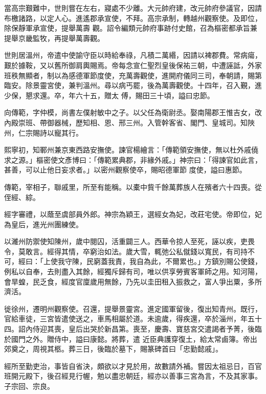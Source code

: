 \begin{pinyinscope}
 當高宗艱難中，世則嘗在左右，寢處不少離。大元帥府建，改元帥府參議官，因請布檄諸路，以定人心。進遙郡承宣使，不拜。高宗承制，轉越州觀察使。及即位，除保靜軍承宣使，提舉萬壽
 觀。詔令編類元帥府事跡付史館，召為樞密都承旨兼提舉京畿監牧，再提舉萬壽觀。



 世則居溫州，帝遣中使諭守臣以時給奉祿，凡積二萬緡，因請以裨郡費。常病瘍，艱於據鞍，又以舊所御肩輿賜焉。帝每念宣仁聖烈皇後保祐三朝，中遭誣詆，外家班秩無顯者，制以為感德軍節度使，充萬壽觀使，進開府儀同三司，奉朝請，賜第臨安。除景靈宮使，兼判溫州。尋以病丐罷，後為萬壽觀使。十四年，召入覲，進少保，懇求還。卒，年六十五，贈太
 傅，賜田三十頃，謚曰忠節。



 向傳範，字仲模，尚書左僕射敏中之子。以父任為衛尉丞。娶南陽郡王惟吉女，改內殿崇班、帶御器械，歷知相、恩、邢三州。入管幹客省、閣門、皇城司。知陜州，仁宗賜詩以寵其行。



 熙寧初，知鄆州兼京東西路安撫使。諫官楊繪言：「傳範領安撫使，無以杜外戚僥求之源。」樞密使文彥博曰：「傳範累典郡，非緣外戚。」神宗曰：「得諫官如此言，甚善，可以止他日妄求者。」以密州觀察使卒，賜昭德軍節
 度使，謚曰惠節。



 傳範，宰相子，聯戚里，所至有能稱。以橐中貲千餘萬葬族人在殯者六十四喪。從侄經、綜。



 經字審禮，以蔭至虞部員外郎。神宗為穎王，選經女為妃，改莊宅使。帝即位，妃為皇后，進光州團練使。



 以濰州防禦使知陳州，歲中閱囚，活重闢三人。西華令掠人至死，誣以疾，吏畏令，莫敢言。經得其情，卒窮治如法。歲大雪，輒弛公私僦錢以寬民，有司持不可，經曰：「上使我守陳，民窮蓋我責，我自為此，不爾累也。」方鎮別賜公使錢，
 例私以自奉，去則盡入其餘，經獨斥歸有司，唯以供享勞賓客軍師之用。知河陽，會旱蝗，民乏食，經度官廩歲用無餘，乃先以圭田租入振救之，富人爭出粟，多所濟活。



 徙徐州，遷明州觀察使。召還，提舉景靈宮。進定國軍留後，復出知青州。既行，官給車徒，三宮皆遣使送之，車馬相屬於道。未逾歲，得疾還，卒於淄州，年五十四。詔內侍迎其喪，皇后出哭於新昌第。喪至，慶壽、寶慈宮交遣謁者予菁，後臨於國門之外。贈侍中，謚曰康懿。將葬，遣
 近臣典護穿復土，給太常鹵簿。帝出郊奠之，周視其柩。葬三日，後臨於墓下，賜篆碑首曰「忠勤懿戚」。



 經所至勤吏治，事皆自省決，頗欲以才見於用，故數請外補。嘗因太祖忌日，百官班開元殿下，後召經見行幄，勉以盡忠朝廷，經亦以善事三宮為言，不及其家事。子宗回、宗良。




\end{pinyinscope}
